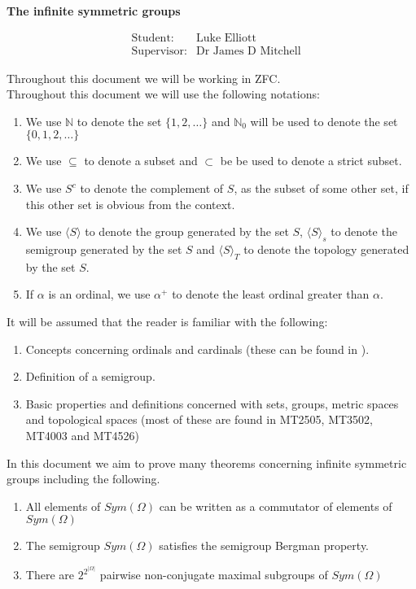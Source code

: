 \documentclass{report}
\begin{document}
\vspace*{2cm}
\begin{huge}
\begin{center}
\textbf{The infinite symmetric groups}
\end{center}
\end{huge}
\begin{align*}
&\text{Student:} &\text{Luke Elliott}\\
&\text{Supervisor:} &\text{Dr James D Mitchell}
\end{align*}

\begingroup
\let\clearpage\relax
\tableofcontents
\endgroup
\pagebreak
Throughout this document we will be working in ZFC.\\
Throughout this document we will use the following notations:
\begin{enumerate}
\item We use $\mathbb{N}$ to denote the set $\{1,2, \ldots\}$ and $\mathbb{N}_0$ will be used to denote the set $\{0,1,2, \ldots\}$
\item We use $\subseteq$ to denote a subset and $\subset$ be be used to denote a strict subset.
\item We use $S^c$ to denote the complement of $S$, as the subset of some other set, if this other set is obvious from the context.
\item We use $\langle S \rangle$ to denote the group generated by the set $S$, $\langle S \rangle_s$ to denote the semigroup generated by the set $S$ and $\langle S \rangle_T$ to denote the topology generated by the set $S$.
\item If $\alpha$ is an ordinal, we use $\alpha^+$ to denote the least ordinal greater than $\alpha$.
\end{enumerate}
It will be assumed that the reader is familiar with the following:
\begin{enumerate}
\item Concepts concerning ordinals and cardinals (these can be found in \cite{ordinals}).
\item Definition of a semigroup.
\item Basic properties and definitions concerned with sets, groups, metric spaces and topological spaces (most of these are found in MT2505, MT3502, MT4003 and MT4526)
\end{enumerate}
In this document we aim to prove many theorems concerning infinite symmetric groups including the following.

\begin{enumerate}
\item All elements of $Sym(\Omega)$ can be written as a commutator of elements of $Sym(\Omega)$
\item The semigroup $Sym(\Omega)$ satisfies the semigroup Bergman property.
\item There are $2^{2^{\vert \Omega \vert}}$ pairwise non-conjugate maximal subgroups of $Sym(\Omega)$
\end{enumerate}
\end{document}

